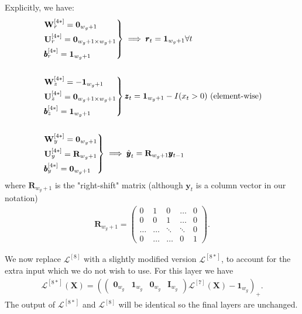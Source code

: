 \documentclass{somasmsc}
\begin{document}
Explicitly, we have:
\begin{align*}
&\begin{rcases}
    \mathbf{W}^{\left[4*\right]}_r = \mathbf{0}_{w_g+1} \\
    \mathbf{U}^{\left[4*\right]}_r = \mathbf{0}_{w_g+1 \times w_g+1} \\
    \pmb{b}^{\left[4*\right]}_r = \mathbf{1}_{w_g+1}
\end{rcases} \implies \pmb{r}_t = \mathbf{1}_{w_g+1} \forall t \\
\\
&\begin{rcases}
    \mathbf{W}^{\left[4*\right]}_z = -\mathbf{1}_{w_g+1} \\
    \mathbf{U}^{\left[4*\right]}_z = \mathbf{0}_{w_g+1 \times w_g+1} \\
    \pmb{b}^{\left[4*\right]}_z = \mathbf{1}_{w_g+1}
\end{rcases} \pmb{z}_t = \mathbf{1}_{w_g+1} - I(x_t > 0) \text{ (element-wise)} \\
\\
&\begin{rcases}
    \mathbf{W}^{\left[4*\right]}_y = \mathbf{0}_{w_g+1} \\
    \mathbf{U}^{\left[4*\right]}_y = \mathbf{R}_{w_g+1} \\
    \pmb{b}^{\left[4*\right]}_y = \mathbf{0}_{w_g+1}
\end{rcases} \implies \hat{\pmb{y}}_t = \mathbf{R}_{w_g+1} \pmb{y}_{t-1}
\end{align*}
where $\mathbf{R}_{w_g+1}$ is the "right-shift" matrix (although $\pmb{y}_t$ is a column vector in our notation)
\begin{align*}
\mathbf{R}_{w_g+1} =
\begin{pmatrix}
    0 & 1 & 0 & \dots & 0 \\
    0 & 0 & 1 & \dots & 0 \\
    \dots & \dots & \ddots & \ddots & 0 \\
    0 & \dots & \dots & 0 & 1
\end{pmatrix}.
\end{align*}

We now replace $\mathcal{L}^{\left[8\right]}$ with a slightly modified version $\mathcal{L}^{\left[8*\right]}$, to account for the extra input which we do not wish to use. For this layer we have
\begin{align*}
\mathcal{L}^{\left[8*\right]}\left(\mathbf{X}\right) = \left(
\begin{pmatrix}
    \mathbf{0}_{w_g} & \mathbf{1}_{w_g} & \mathbf{0}_{w_g} & \mathbf{I}_{w_g}
\end{pmatrix}
\mathcal{L}^{\left[7\right]}\left(\mathbf{X}\right)
- \mathbf{1}_{w_g}\right)_+.
\end{align*}
The output of $\mathcal{L}^{\left[8*\right]}$ and $\mathcal{L}^{\left[8\right]}$ will be identical so the final layers are unchanged.
\end{document}
